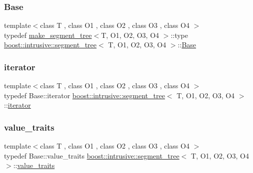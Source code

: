\subsubsection{\texorpdfstring{Base}{Base}}
{\footnotesize\ttfamily template$<$class T , class O1 , class O2 , class O3 , class O4 $>$ \\
typedef \hyperlink{structboost_1_1intrusive_1_1make__segment__tree}{make\+\_\+segment\+\_\+tree}$<$T, O1, O2, O3, O4 $>$\+::type \hyperlink{classboost_1_1intrusive_1_1segment__tree}{boost\+::intrusive\+::segment\+\_\+tree}$<$ T, O1, O2, O3, O4 $>$\+::\hyperlink{classboost_1_1intrusive_1_1segment__tree_a56984f6fac5fb61618c53ca07704cf45}{Base}}

\mbox{\label{classboost_1_1intrusive_1_1segment__tree_a20e4825aed9b33d2de0b7f4177bacd7b}} 
\subsubsection{\texorpdfstring{iterator}{iterator}}
{\footnotesize\ttfamily template$<$class T , class O1 , class O2 , class O3 , class O4 $>$ \\
typedef Base\+::iterator \hyperlink{classboost_1_1intrusive_1_1segment__tree}{boost\+::intrusive\+::segment\+\_\+tree}$<$ T, O1, O2, O3, O4 $>$\+::\hyperlink{classboost_1_1intrusive_1_1segment__tree_a20e4825aed9b33d2de0b7f4177bacd7b}{iterator}}

\mbox{\label{classboost_1_1intrusive_1_1segment__tree_aaff3016f655ec2b1dfe44282913cefea}} 
\subsubsection{\texorpdfstring{value\+\_\+traits}{value\_traits}}
{\footnotesize\ttfamily template$<$class T , class O1 , class O2 , class O3 , class O4 $>$ \\
typedef Base\+::value\+\_\+traits \hyperlink{classboost_1_1intrusive_1_1segment__tree}{boost\+::intrusive\+::segment\+\_\+tree}$<$ T, O1, O2, O3, O4 $>$\+::\hyperlink{classboost_1_1intrusive_1_1segment__tree_aaff3016f655ec2b1dfe44282913cefea}{value\+\_\+traits}}




